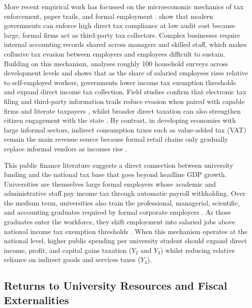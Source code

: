 \documentclass[11pt,a4paper]{article}
\begin{document}
More recent empirical work has focussed on the microeconomic mechanics of tax enforcement, paper trails, and formal employment \citep{kleven2016why, keen2017optimal, pomeranz2019taking}. \citet{kleven2016why} show that modern governments can enforce high direct tax compliance at low audit cost because large, formal firms act as third-party tax collectors. Complex businesses require internal accounting records shared across managers and skilled staff, which makes collusive tax evasion between employers and employees difficult to sustain. Building on this mechanism, \citet{jensen2022employment} analyses roughly 100 household surveys across development levels and shows that as the share of salaried employees rises relative to self-employed workers, governments lower income tax exemption thresholds and expand direct income tax collection. Field studies confirm that electronic tax filing and third-party information trails reduce evasion when paired with capable firms and literate taxpayers \citep{pomeranz2019taking, okunogbe2022technology}, whilst broader direct taxation can also strengthen citizen engagement with the state \citep{weigel2020participation}. By contrast, in developing economies with large informal sectors, indirect consumption taxes such as value-added tax (VAT) remain the main revenue source because formal retail chains only gradually replace informal vendors as incomes rise \citep{bachas2024informality}.

This public finance literature suggests a direct connection between university funding and the national tax base that goes beyond headline GDP growth. Universities are themselves large formal employers whose academic and administrative staff pay income tax through automatic payroll withholding. Over the medium term, universities also train the professional, managerial, scientific, and accounting graduates required by formal corporate employers \citep{kleven2016why, valero2019economic}. As those graduates enter the workforce, they shift employment into salaried jobs above national income tax exemption thresholds \citep{jensen2022employment}. When this mechanism operates at the national level, higher public spending per university student should expand direct income, profit, and capital gains taxation ($Y_2$ and $Y_3$) whilst reducing relative reliance on indirect goods and services taxes ($Y_4$).

\subsection{Returns to University Resources and Fiscal Externalities}
\end{document}

